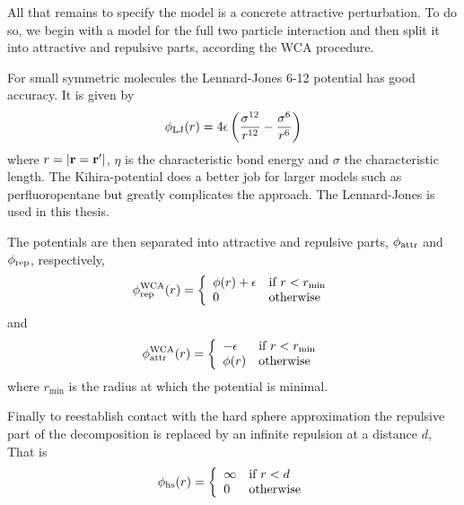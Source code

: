 All that remains to specify the model is a concrete attractive perturbation.
To do so, we begin with a model for the full two particle interaction 
and then split it into attractive and repulsive parts, according the WCA procedure.

For small symmetric molecules the Lennard-Jones 6-12 potential has good accuracy.
It is given by
\begin{align}
  \phi_{\textrm{LJ}}(r) = 4\epsilon\left( \frac{\sigma^{12}}{r^{12}} - \frac{\sigma^{6}}{r^{6}} \right)
\end{align}
where $r = \left| \textbf{r}=\textbf{r}^\prime \right|$, $\eta$ is the characteristic bond energy 
and $\sigma$ the characteristic length.
The Kihira-potential does a better job for larger models such as perfluoropentane 
but greatly complicates the approach.
The Lennard-Jones is used  in this thesis.


The potentials are then separated into attractive and repulsive parts, $\phi_{\text{attr}}$ and $\phi_{\text{rep}}$, respectively,
\begin{align}
  \phi_{\text{rep}}^{\text{WCA}}(r) = \left\{
    \begin{array}{ll}
      \phi(r) +  \epsilon & \text{if $r<r_{\textrm{min}}$}\\
      0 & \text{otherwise}
    \end{array} \right. 
\end{align}
and 
\begin{align}
  \phi_{\text{attr}}^{\text{WCA}}(r) = \left\{ 
    \begin{array}{ll}
      - \epsilon & \text{if $r<r_{\textrm{min}}$}\\
      \phi(r) & \text{otherwise}
    \end{array} \right.
\end{align}
where $r_\min$ is the radius at which the potential is minimal.

Finally to reestablish contact with the hard sphere approximation 
the repulsive part of the decomposition is replaced by an infinite repulsion at a distance $d$,
That is 
\begin{align}
  \phi_{\text{hs}}(r) = \left\{
    \begin{array}{ll}
      \infty & \text{if $r<d$}\\
      0 & \text{otherwise}
    \end{array} \right. 
\end{align}


